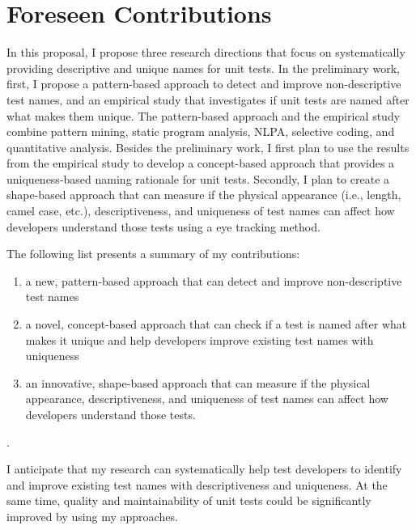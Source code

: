 \section{Foreseen Contributions}
\label{sec:contributions}

In this proposal, I propose three research directions that focus on systematically providing descriptive and unique names for unit tests.
%
In the preliminary work, first, I propose a pattern-based approach to detect and improve non-descriptive test names, and an empirical study that investigates if unit tests are named after what makes them unique.
%
The pattern-based approach and the empirical study combine pattern mining, static program analysis, NLPA, selective coding, and quantitative analysis. 
%
Besides the preliminary work, I first plan to use the results from the empirical study to develop a concept-based approach that provides a uniqueness-based naming rationale for unit tests.
%
Secondly, I plan to create a shape-based approach that can measure if the physical appearance (i.e., length, camel case, etc.), descriptiveness, and uniqueness of test names can affect how developers understand those tests using a eye tracking method.

The following list presents a summary of my contributions:
\begin{enumerate}
    \item a new, pattern-based approach that can detect and improve non-descriptive test names
    \item a novel, concept-based approach that can check if a test is named after what makes it unique and help developers improve existing test names with uniqueness
    \item an innovative, shape-based approach that can measure if the physical appearance, descriptiveness, and uniqueness of test names can affect how developers understand those tests.
\end{enumerate}.

I anticipate that my research can systematically help test developers to identify and improve existing test names with descriptiveness and uniqueness.
%
At the same time, quality and maintainability of unit tests could be significantly improved by using my approaches.